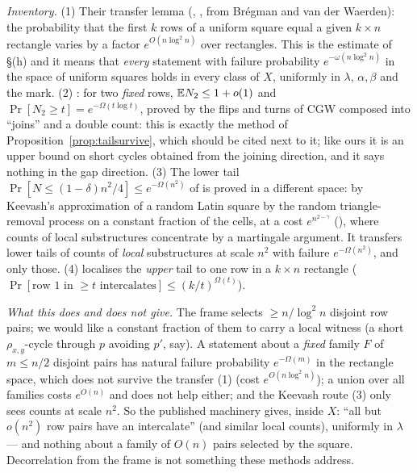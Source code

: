 \emph{Inventory.}  (1) Their transfer lemma (\cite[Prop.~5]{KS18},
\cite[Thm.~3.3]{KSS21}, from Br\'egman and van der Waerden): the
probability that the first $k$ rows of a uniform square equal a given
$k\times n$ rectangle varies by a factor $e^{O(n\log^2n)}$ over
rectangles.  This is the estimate of \S(h) and it means that
\emph{every} statement with failure probability $e^{-\omega(n\log^2n)}$
in the space of uniform squares holds in every class of $X$, uniformly
in $\lambda$, $\alpha,\beta$ and the mark.  (2) \cite[Thm.~3]{KS18}:
for two \emph{fixed} rows, $\mathbb{E} N_2\le1+o(1)$ and
$\Pr[N_2\ge t]=e^{-\Omega(t\log t)}$, proved by the flips and turns of
CGW composed into ``joins'' and a double count: this is exactly the
method of Proposition~\ref{prop:tailsurvive}, which should be cited
next to it; like ours it is an upper bound on short cycles obtained
from the joining direction, and it says nothing in the gap direction.
(3) The lower tail $\Pr[N\le(1-\delta)n^2/4]\le e^{-\Omega(n^2)}$ of
\cite{KSS21} is proved in a different space: by Keevash's
approximation of a random Latin square by the random triangle-removal
process on a constant fraction of the cells, at a cost
$e^{n^{2-\gamma}}$ (\cite[Thm.~2.4]{KSS21}), where counts of local
substructures concentrate by a martingale argument.  It transfers lower
tails of counts of \emph{local} substructures at scale $n^2$ with
failure $e^{-\Omega(n^2)}$, and only those.  (4) \cite[Lemma~6.4]{KSS21}
localises the \emph{upper} tail to one row in a $k\times n$ rectangle
($\Pr[\text{row $1$ in $\ge t$ intercalates}]\le(k/t)^{\Omega(t)}$).

\emph{What this does and does not give.}  The frame selects
$\ge n/\log^2n$ disjoint row pairs; we would like a constant fraction
of them to carry a local witness (a short $\rho_{x,y}$-cycle through
$p$ avoiding $p'$, say).  A statement about a \emph{fixed} family $F$
of $m\le n/2$ disjoint pairs has natural failure probability
$e^{-\Omega(m)}$ in the rectangle space, which does not survive the
transfer (1) (cost $e^{O(n\log^2n)}$); a union over all families costs
$e^{O(n)}$ and does not help either; and the Keevash route (3) only
sees counts at scale $n^2$.  So the published machinery gives, inside
$X$: ``all but $o(n^2)$ row pairs have an intercalate'' (and similar
local counts), uniformly in $\lambda$ --- and nothing about a family of
$O(n)$ pairs selected by the square.  Decorrelation from the frame is
not something these methods address.

